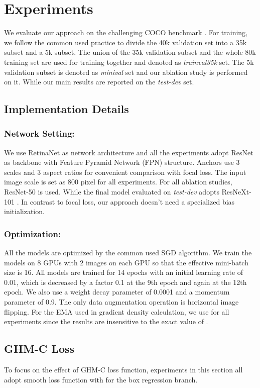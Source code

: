 \documentclass[letterpaper]{article} \usepackage{aaai19}  \usepackage{times}  \usepackage{helvet}  \usepackage{courier}  \usepackage{url}  \usepackage{graphicx}  \usepackage{amsmath,amssymb}
\begin{document}
\section{Experiments}
We evaluate our approach on the challenging COCO benchmark \cite{coco}. For training, we follow the common used practice \cite{mask,focal} to divide the 40k validation set into a 35k subset and a 5k subset. The union of the 35k validation subset and the whole 80k training set are used for training together and denoted as \textit{trainval35k} set. The 5k validation subset is denoted as \textit{minival} set and our ablation study is performed on it. While our main results are reported on the \textit{test-dev} set.

\subsection{Implementation Details}
\subsubsection{Network Setting:} We use RetinaNet \cite{focal} as  network architecture and all the experiments adopt ResNet \cite{resnet} as backbone with Feature Pyramid Network (FPN) \cite{fpn} structure. Anchors use 3 scales and 3 aspect ratios for convenient comparison with focal loss. The input image scale is set as 800 pixel for all experiments. For all ablation studies, ResNet-50 is used. While the final model evaluated on \textit{test-dev} adopts ResNeXt-101 \cite{resnext}. In contrast to focal loss, our approach doesn't need a specialized bias initialization.

\subsubsection{Optimization:} All the models are optimized by the common used SGD algorithm. We train the models on 8 GPUs with 2 images on each GPU so that the effective mini-batch size is 16. All models are trained for 14 epochs with an initial learning rate of 0.01, which is decreased by a factor 0.1 at the 9th epoch and again at the 12th epoch. We also use a weight decay parameter of 0.0001 and a momentum parameter of 0.9. The only data augmentation operation is horizontal image flipping. For the EMA used in gradient density calculation, we use  for all experiments since the results are insensitive to the exact value of .

\subsection{GHM-C Loss}
To focus on the effect of  GHM-C loss function, experiments in this section all adopt smooth  loss function with  for the box regression branch. 
\end{document}

